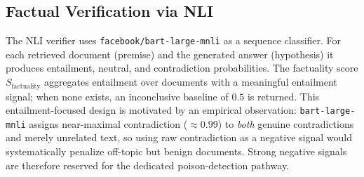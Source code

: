 
\subsection{Factual Verification via NLI}
The NLI verifier uses \texttt{facebook/bart-large-mnli} as a sequence classifier. For each retrieved document (premise) and the generated answer (hypothesis) it produces entailment, neutral, and contradiction probabilities. The factuality score $S_{\text{factuality}}$ aggregates entailment over documents with a meaningful entailment signal; when none exists, an inconclusive baseline of $0.5$ is returned. This entailment-focused design is motivated by an empirical observation: \texttt{bart-large-mnli} assigns near-maximal contradiction ($\approx0.99$) to \emph{both} genuine contradictions and merely unrelated text, so using raw contradiction as a negative signal would systematically penalize off-topic but benign documents. Strong negative signals are therefore reserved for the dedicated poison-detection pathway.

